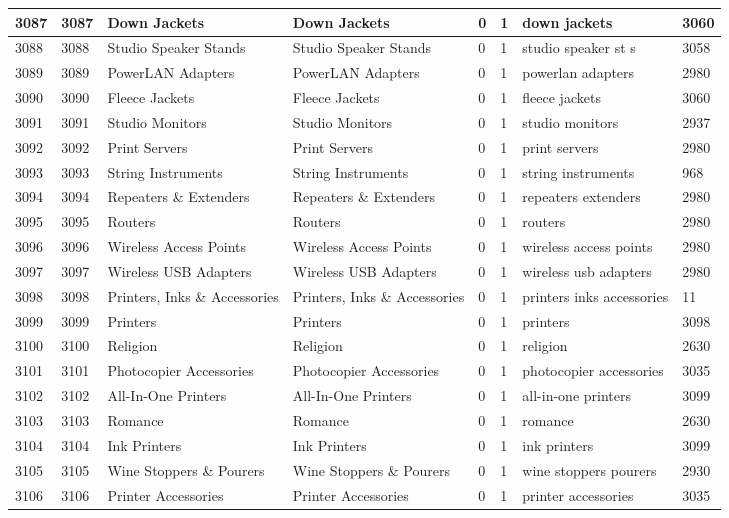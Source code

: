 \begin{longtable}{|l|l|l|l|l|l|l|l|}
3087 & 3087 & Down Jackets & Down Jackets & 0 & 1 & down jackets & 3060 \\ \hline 
3088 & 3088 & Studio Speaker Stands & Studio Speaker Stands & 0 & 1 & studio speaker st s & 3058 \\ \hline 
3089 & 3089 & PowerLAN Adapters & PowerLAN Adapters & 0 & 1 & powerlan adapters & 2980 \\ \hline 
3090 & 3090 & Fleece Jackets & Fleece Jackets & 0 & 1 & fleece jackets & 3060 \\ \hline 
3091 & 3091 & Studio Monitors & Studio Monitors & 0 & 1 & studio monitors & 2937 \\ \hline 
3092 & 3092 & Print Servers & Print Servers & 0 & 1 & print servers & 2980 \\ \hline 
3093 & 3093 & String Instruments & String Instruments & 0 & 1 & string instruments & 968 \\ \hline 
3094 & 3094 & Repeaters \& Extenders & Repeaters \& Extenders & 0 & 1 & repeaters extenders & 2980 \\ \hline 
3095 & 3095 & Routers & Routers & 0 & 1 & routers & 2980 \\ \hline 
3096 & 3096 & Wireless Access Points & Wireless Access Points & 0 & 1 & wireless access points & 2980 \\ \hline 
3097 & 3097 & Wireless USB Adapters & Wireless USB Adapters & 0 & 1 & wireless usb adapters & 2980 \\ \hline 
3098 & 3098 & Printers, Inks \& Accessories & Printers, Inks \& Accessories & 0 & 1 & printers inks accessories & 11 \\ \hline 
3099 & 3099 & Printers & Printers & 0 & 1 & printers & 3098 \\ \hline 
3100 & 3100 & Religion & Religion & 0 & 1 & religion & 2630 \\ \hline 
3101 & 3101 & Photocopier Accessories & Photocopier Accessories & 0 & 1 & photocopier accessories & 3035 \\ \hline 
3102 & 3102 & All-In-One Printers & All-In-One Printers & 0 & 1 & all-in-one printers & 3099 \\ \hline 
3103 & 3103 & Romance & Romance & 0 & 1 & romance & 2630 \\ \hline 
3104 & 3104 & Ink Printers & Ink Printers & 0 & 1 & ink printers & 3099 \\ \hline 
3105 & 3105 & Wine Stoppers \& Pourers & Wine Stoppers \& Pourers & 0 & 1 & wine stoppers pourers & 2930 \\ \hline 
3106 & 3106 & Printer Accessories & Printer Accessories & 0 & 1 & printer accessories & 3035 \\ \hline 

\end{longtable}
